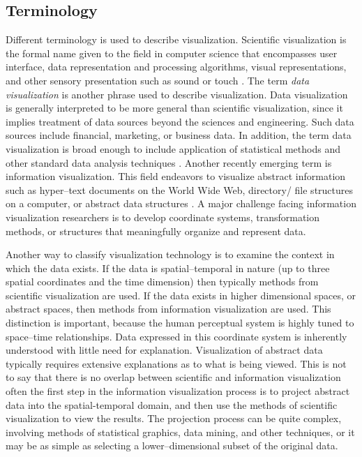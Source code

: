 \subsection{Terminology}
Different terminology is used to describe visualization. Scientific visualization is the formal name given to the field in computer science that  encompasses user interface, data representation and processing algorithms, visual representations, and other sensory presentation such as sound or touch \cite{McCormick87}.
The term \emph{data visualization} is another phrase used to describe visualization. Data visualization is generally interpreted to be more general than scientific visualization, since it implies treatment of data sources beyond the sciences and engineering. Such data sources include financial, marketing, or business data. In addition, the term data visualization is broad enough to include application of statistical methods and other standard data analysis techniques \cite{Rosenblum94}.
Another recently emerging term is information visualization. 
This field endeavors to visualize abstract information such as hyper--text documents on the World Wide Web, directory/ file structures on a computer, or abstract data structures \cite{InfoVis95}.
A major challenge facing information visualization researchers is to develop coordinate systems, transformation methods, or structures that meaningfully organize and represent data.

Another way to classify visualization technology is to examine the context in which the data exists. If the data is spatial--temporal in nature (up to three spatial coordinates and the time dimension) then typically methods from scientific visualization are used. If the data exists in higher dimensional spaces, or abstract spaces, then methods from information visualization are used.
This distinction is important, because the human perceptual system is highly tuned to space--time relationships.
Data expressed in this coordinate system is inherently understood with little need for explanation. Visualization of abstract data typically requires extensive explanations as to what is being viewed. This is not to say that there is no overlap between scientific and information visualization often the first step in the information visualization process is to project abstract data into the spatial-temporal domain, and then use the methods of scientific visualization to view the results. The projection process can be quite complex, involving methods of statistical graphics, data
mining, and other techniques, or it may be as simple as selecting a lower--dimensional subset of the original data.

